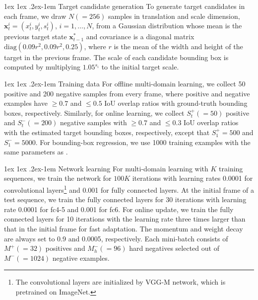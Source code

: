 \documentclass[10pt,twocolumn,letterpaper]{article}
\makeatletter
\renewcommand{\paragraph}{%
  \@startsection{paragraph}{4}%
  {\z@}{1ex \@plus 1ex \@minus .2ex}{-1em}%
  {\normalfont\normalsize\bfseries}%
}
\makeatother
\begin{document}
\paragraph{Target candidate generation}
To generate target candidates in each frame, we draw $N (=256)$ samples in translation and scale dimension, $\mathbf{x}_t^i=(x_t^i, y_t^i, s_t^i)$, $i=1,\dots,N$, from a Gaussian distribution whose mean is the previous target state $\mathbf{x}_{t-1}^*$ and covariance is a diagonal matrix $\text{diag}(0.09r^2, 0.09r^2, 0.25)$, where $r$ is the mean of the width and height of the target in the previous frame. 
The scale of each candidate bounding box is computed by multiplying $1.05^{s_i}$ to the initial target scale.

\paragraph{Training data}
For offline multi-domain learning, we collect 50 positive and 200 negative samples from every frame, where positive and negative examples have $\geq 0.7$ and $\leq 0.5$ IoU overlap ratios with ground-truth bounding boxes, respectively. 
Similarly, for online learning, we collect $S_t^+ (=50)$ positive and $S_t^- (=200)$ negative samples with $\geq 0.7$ and $\leq 0.3$ IoU overlap ratios with the estimated target bounding boxes, respectively, except that $S_1^+=500$ and $S_1^-=5000$.
For bounding-box regression, we use 1000 training examples with the same parameters as \cite{girshick2014rich}.

\paragraph{Network learning}
For multi-domain learning with $K$ training sequences, we train the network for $100K$ iterations with learning rates 0.0001 for convolutional layers\footnote{The convolutional layers are initialized by VGG-M network, which is pretrained on ImageNet.} and 0.001 for fully connected layers.
At the initial frame of a test sequence, we train the fully connected layers for 30 iterations with learning rate 0.0001 for fc4-5 and 0.001 for fc6.
For online update, we train the fully connected layers for 10 iterations with the learning rate three times larger than that in the initial frame for fast adaptation.
The momentum and weight decay are always set to 0.9 and 0.0005, respectively.
Each mini-batch consists of $M^+ (=32)$ positives and  $M_h^- (=96)$ hard negatives selected out of $M^- (=1024)$ negative examples.
\end{document}
